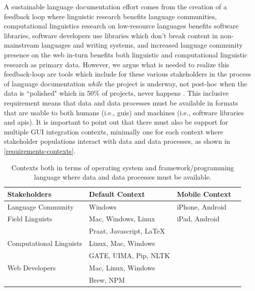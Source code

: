 \documentclass[11pt]{article}
\begin{document}
A sustainable language documentation effort comes from the creation of a feedback loop where linguistic research benefits language communities,
computational linguistics research on low-resource languages benefits software libraries, 
software developers use libraries which don't break content in non-mainstream languages and writing systems,
and increased language community presence on the web in-turn benefits both linguistic and computational linguistic research as primary data. 
However, we argue what is needed to realize this feedback-loop are tools which include for these various  stakeholders in the process of language documentation \emph{while} the project is underway, not post-hoc when the data is ``polished" which in 50\% of projects, never happens \cite{Thieberger:2012}. 
This inclusive requirement means that data and data processes must be available in formats that are usable to both humans  (i.e., \glspl{gui}) and machines (i.e., software libraries and \glspl{api}). It is important to point out that there must also be support for multiple GUI integration contexts, minimally one for each context where stakeholder populations interact with data and data processes, as shown in \autoref{requirements-contexts}.


\begin{table}[h]
\begin{center}
\scriptsize
\begin{tabular}{llll}
      \toprule
      Stakeholders & Default Context & Mobile Context\\\hline\hline
     
      Language Community & Windows &  iPhone, Android\\
      \midrule

	Field Linguists & Mac, Windows, Linux & iPad, Android\\
	  & Praat, Javascript, LaTeX \\
	  \midrule

	Computational Linguists & Linux, Mac, Windows\\
	 & GATE, UIMA, Pip, NLTK\\
	\midrule

	Web Developers & Mac, Linux, Windows\\
	 & Brew, NPM\\

      \bottomrule

\end{tabular}
\caption{Contexts both in terms of operating system and framework/programming language where data and  data processes must be available.}
\label{requirements-contexts}
 \end{center}
 \normalsize
\end{table}
\end{document}
